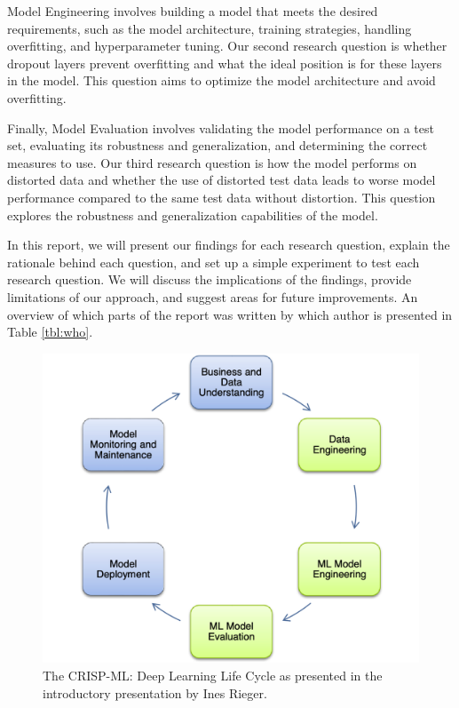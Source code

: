\documentclass[a4paper]{article}
\begin{document}
Model Engineering involves building a model that meets the desired requirements, such as the model architecture, training strategies, handling overfitting, and hyperparameter tuning. Our second research question is whether dropout layers prevent overfitting and what the ideal position is for these layers in the model. This question aims to optimize the model architecture and avoid overfitting.

Finally, Model Evaluation involves validating the model performance on a test set, evaluating its robustness and generalization, and determining the correct measures to use. Our third research question is how the model performs on distorted data and whether the use of distorted test data leads to worse model performance compared to the same test data without distortion. This question explores the robustness and generalization capabilities of the model.

In this report, we will present our findings for each research question, explain the rationale behind each question, and set up a simple experiment to test each research question. We will discuss the implications of the findings, provide limitations of our approach, and suggest areas for future improvements. An overview of which parts of the report was written by which author is presented in Table \ref{tbl:who}.

\begin{figure}
       \centering
      \includegraphics[width=.5\textwidth]{img/crisp.png}
       \caption{The CRISP-ML: Deep Learning Life Cycle as presented in the introductory presentation by Ines Rieger.}
       \label{fig:crisp}
   \end{figure} 
\end{document}
